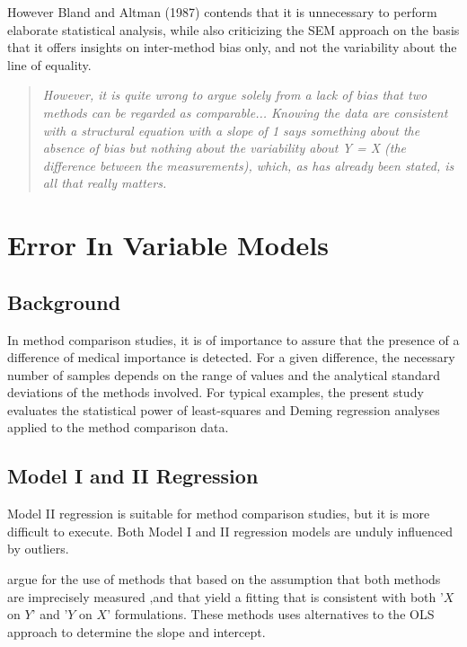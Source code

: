\documentclass[12pt, a4paper]{report}
\theoremstyle{plain}
\theoremstyle{definition}
\theoremstyle{remark}
\begin{document}
	
	However Bland and Altman (1987) contends that it is unnecessary to perform elaborate statistical analysis, while also criticizing the SEM approach on the basis that it offers insights  on inter-method bias only, and not the variability about the line of equality. 
	\begin{quote}
		\textit{	However, it is quite wrong to argue solely from a lack of bias that two methods can be regarded as comparable...
			Knowing the data are consistent with a structural equation with a slope of 1 says something 
			about the absence of bias but nothing about the variability about Y = X (the difference between the measurements), which, as has already been stated, is all that really matters.}
	\end{quote}
	
	
	
	
	
	\section{Error In Variable Models}
	
	
	
	\subsection{Background} 
	In method comparison studies, it is of importance to assure that the presence of a difference of medical importance is detected. 
	For a given difference, the necessary number of samples depends on the range of values and the analytical standard deviations of the methods involved. For typical examples, the present study evaluates the statistical power of least-squares and Deming regression analyses applied to the method comparison data.
	
	
	
	
	
	
	\subsection{Model I and II Regression}
	

	
	Model II regression is suitable for method comparison studies, but it is more difficult to execute. Both Model I and II regression models are unduly influenced by outliers.
	
	
\citet{CornCoch} argue for the use of methods that based on
	the assumption that both methods are imprecisely measured ,and
	that yield a fitting that is consistent with both '$X$ on $Y$' and
	'$Y$ on $X$' formulations. These methods uses alternatives to the
	OLS approach to determine the slope and intercept.
	
\end{document}
